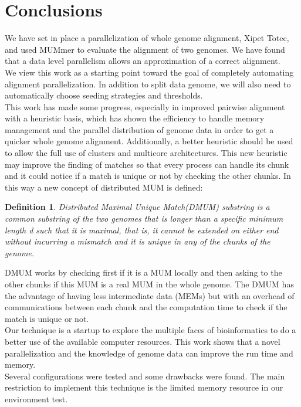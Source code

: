 \documentclass[twocolumn,twoside]{Jornadas}
\newtheorem{mydef}{Definition}
\begin{document}
\section{Conclusions}
We have set in place a parallelization of whole genome alignment, Xipet Totec, and used MUMmer to evaluate the alignment of two genomes. We have found that a data level parallelism allows an approximation of a correct alignment.\\
We view this work as a starting point toward the goal of completely automating alignment parallelization. In addition to split data genome, we will also need to automatically choose seeding strategies and thresholds. \\
This work has made some progress, especially in improved pairwise alignment with a heuristic basis, which has shown the efficiency to handle memory management and the parallel distribution of genome data in order to get a quicker whole genome alignment. Additionally, a better heuristic should be used to allow the full use of clusters and multicore architectures. This new heuristic may improve the finding of matches so that every process can handle its chunk and it could notice if a match is unique or not by checking the other chunks. In this way a new concept of distributed MUM is defined:
\begin{center}
\begin{mydef}
Distributed Maximal Unique Match(DMUM) substring is a common substring of the two genomes that is longer than a specific minimum length d such that it is maximal, that is, it cannot be extended on either end without incurring a mismatch and it is unique in any of the chunks of the genome.
\end{mydef}
\end{center}
DMUM works by checking first if it is a MUM locally and then asking to the other chunks if this MUM is a real MUM in the whole genome. The DMUM has the advantage of having less intermediate data (MEMs) but with an overhead of communications between each chunk and the computation time to check if the match is unique or not.\\
Our technique is a startup to explore the multiple faces of bioinformatics to do a better use of the available computer resources. This work shows that a novel parallelization and the knowledge of genome data can improve the run time and memory.\\
Several configurations were tested and some drawbacks were found. The main restriction to implement this technique  is the  limited memory resource in our environment test.
\end{document}
